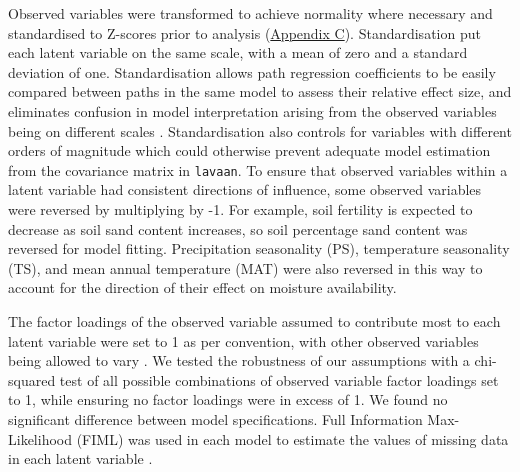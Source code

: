\documentclass[11pt,a4paper]{article}
\begin{document}
Observed variables were transformed to achieve normality where necessary and standardised to Z-scores prior to analysis (\hyperref[appendixc]{Appendix C}). Standardisation put each latent variable on the same scale, with a mean of zero and a standard deviation of one. Standardisation allows path regression coefficients to be easily compared between paths in the same model to assess their relative effect size, and eliminates confusion in model interpretation arising from the observed variables being on different scales \citep{Beaujean2014}. Standardisation also controls for variables with different orders of magnitude which could otherwise prevent adequate model estimation from the covariance matrix in \verb|lavaan|. To ensure that observed variables within a latent variable had consistent directions of influence, some observed variables were reversed by multiplying by -1. For example, soil fertility is expected to decrease as soil sand content increases, so soil percentage sand content was reversed for model fitting. Precipitation seasonality (PS), temperature seasonality (TS), and mean annual temperature (MAT) were also reversed in this way to account for the direction of their effect on moisture availability.


The factor loadings of the observed variable assumed to contribute most to each latent variable were set to 1 as per convention, with other observed variables being allowed to vary \citep{Beaujean2014}.  We tested the robustness of our assumptions with a chi-squared test of all possible combinations of observed variable factor loadings set to 1, while ensuring no factor loadings were in excess of 1. We found no significant difference between model specifications. Full Information Max-Likelihood (FIML) was used in each model to estimate the values of missing data in each latent variable \citep{Cham2017}.
\end{document}
